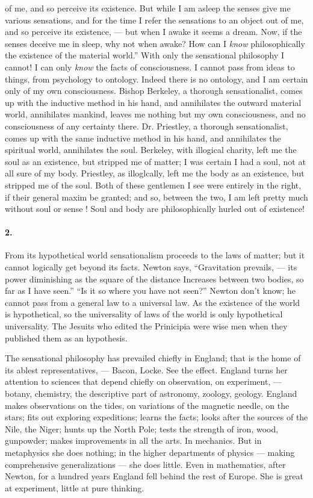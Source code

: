 \documentclass[12pt]{article}
\begin{document}

of me, and so perceive its existence. But while I am 
asleep the senses give me various sensations, and for 
the time I refer the sensations to an object out of me, 
and so perceive its existence, --- but when I awake it 
seems a dream. Now, if the senses deceive me in sleep, 
why not when awake? How can I \emph{know} philosophically the existence of the material world.'' With only 
the sensational philosophy I cannot! I can only \emph{know} 
the facts of consciousness. I cannot pass from ideas 
to things, from psychology to ontology. Indeed there 
is no ontology, and I am certain only of my own consciousness. Bishop Berkeley, a thorough sensationalist, comes up with the inductive method in his hand, 
and annihilates the outward material world, annihilates 
mankind, leaves me nothing but my own consciousness, 
and no consciousness of any certainty there. Dr. 
Priestley, a thorough sensationalist, comes up with the 
same inductive method in his hand, and annihilates the 
spiritual world, annihilates the soul. Berkeley, with 
illogical charity, left me the soul as an existence, but 
stripped me of matter; I was certain I had a soul, not 
at all sure of my body. Priestley, as illoglcally, left 
me the body as an existence, but stripped me of the 
soul. Both of these gentlemen I see were entirely in 
the right, if their general maxim be granted; and so, 
between the two, I am left pretty much without soul or 
sense ! Soul and body are philosophically hurled out 
of existence! 

\paragraph{2.} From its hypothetical world sensationalism proceeds to the laws of matter; but it cannot logically get 
beyond its facts. Newton says, ``Gravitation prevails, --- its power diminishing as the square of the distance Increases between two bodies, so far as I have 
seen.'' ``Is it so where you have not seen?'' Newton 
don't know; he cannot pass from a general law to a 
universal law. As the existence of the world is hypothetical, so the universality of laws of the world is 
only hypothetical universality. The Jesuits who edited 
the Prinicipia were wise men when they published them 
as an hypothesis.

The sensational philosophy has prevailed chiefly in 
England; that is the home of its ablest representatives, 
--- Bacon, Locke. See the effect. England turns her 
attention to sciences that depend chiefly on observation, on experiment, --- botany, chemistry, the descriptive part of astronomy, zoology, geology. England 
makes observations on the tides, on variations of the 
magnetic needle, on the stars; fits out exploring expeditions; learns the facts; looks after the sources of 
the Nile, the Niger; hunts up the North Pole; tests 
the strength of iron, wood, gunpowder; makes improvements in all the arts. In mechanics. But in metaphysics she does nothing; in the higher departments 
of physics --- making comprehensive generalizations --- 
she does little. Even in mathematics, after Newton, 
for a hundred years England fell behind the rest of 
Europe. She is great at experiment, little at pure 
thinking. 
\end{document}
